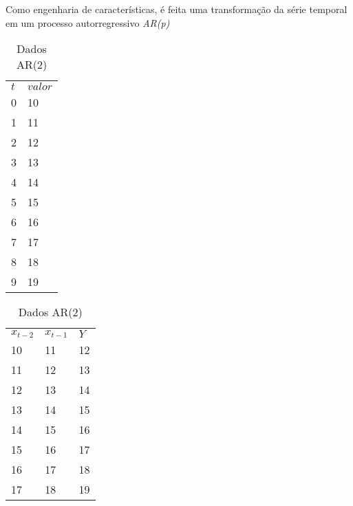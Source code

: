 \documentclass[twocolumn]{rbef}
\newcommand{\1}{\mathbbm{1}}
\begin{document}
Como engenharia de características, é feita uma transformação da série temporal em um processo autorregressivo \textit{AR(p)}

\begin{table}[!htb]
    \caption{Transformação dos dados em processo AR(p)}
    \begin{minipage}{.5\linewidth}
      \caption{Dados originais}
      \centering
        \begin{tabular}{ll}\label{rawdata}
            $t$ & $valor$ \\
            0 & 10 \\
            1 & 11 \\
            2 & 12 \\
            3 & 13 \\
            4 & 14 \\
            5 & 15 \\
            6 & 16 \\
            7 & 17 \\
            8 & 18 \\
            9 & 19 \\
        \end{tabular}
    \end{minipage}%
    \begin{minipage}{.5\linewidth}
      \centering
        \caption{Dados AR(2)}
        \begin{tabular}{lll}\label{AR2}
            $x_{t-2}$ & $x_{t-1}$ & $Y$ \\
            10 & 11 & 12 \\
            11 & 12 & 13 \\
            12 & 13 & 14 \\
            13 & 14 & 15 \\
            14 & 15 & 16 \\
            15 & 16 & 17 \\
            16 & 17 & 18 \\
            17 & 18 & 19 \\
        \end{tabular}
    \end{minipage} 
\end{table}
\end{document}
